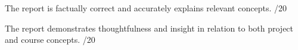 \documentclass[12pt,info]{asg}
\begin{document}
The report is factually correct and accurately explains relevant concepts. /20

The report demonstrates thoughtfulness and insight in relation to both project and course concepts. /20




\end{document}

